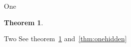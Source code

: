 \documentclass{beamer}
\newtheorem{thm}{Theorem}[section]
\begin{document}
    \begin{frame}{One}
        \begin{thm}\label<1>{thm:one}\end{thm}


    \end{frame}

    \begin{frame}{Two}
        See theorem~\ref{thm:one} and~\ref{thm:onehidden}
    \end{frame}
\end{document}
